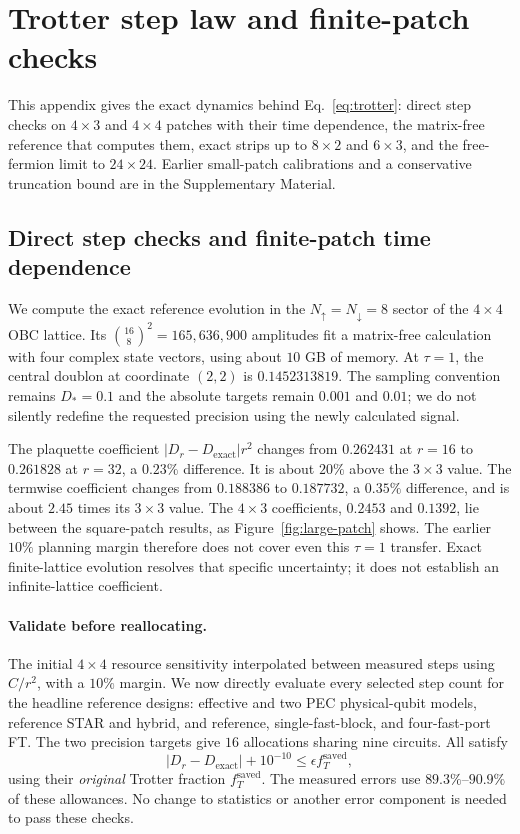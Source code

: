 \documentclass[11pt]{article}
\newcommand{\eps}{\epsilon}
\begin{document}
\clearpage
\appendix

\section{Trotter step law and finite-patch checks}\label{app:trotter}
This appendix gives the exact dynamics behind Eq.~\eqref{eq:trotter}: direct step checks on $4\times3$ and $4\times4$ patches with their time dependence, the matrix-free reference that computes them, exact strips up to $8\times2$ and $6\times3$, and the free-fermion limit to $24\times24$. Earlier small-patch calibrations and a conservative truncation bound are in the Supplementary Material.

\subsection{Direct step checks and finite-patch time dependence}\label{sec:large-patch}
We compute the exact reference evolution in the
$N_\uparrow=N_\downarrow=8$ sector of the $4\times4$ OBC lattice.
Its $\binom{16}{8}^2=165{,}636{,}900$ amplitudes fit a matrix-free
calculation with four complex state vectors, using about $10$ GB of memory.
At $\tau=1$, the central doublon at coordinate $(2,2)$ is
$0.1452313819$. The sampling convention remains $D_*=0.1$ and the
absolute targets remain $0.001$ and $0.01$; we do not silently redefine the
requested precision using the newly calculated signal.

The plaquette coefficient $|D_r-D_{\mathrm{exact}}|r^2$ changes from
$0.262431$ at $r=16$ to $0.261828$ at $r=32$, a $0.23\%$ difference.
It is about $20\%$ above the $3\times3$ value. The termwise coefficient
changes from $0.188386$ to $0.187732$, a $0.35\%$ difference, and is
about $2.45$ times its $3\times3$ value. The $4\times3$ coefficients,
$0.2453$ and $0.1392$, lie between the square-patch results, as
Figure~\ref{fig:large-patch} shows. The earlier $10\%$ planning margin therefore does not cover even
this $\tau=1$ transfer. Exact finite-lattice evolution resolves that
specific uncertainty; it does not establish an infinite-lattice coefficient.

\paragraph{Validate before reallocating.}
The initial $4\times4$ resource sensitivity interpolated between measured
steps using $C/r^2$, with a $10\%$ margin. We now directly evaluate every
selected step count for the headline reference designs: effective and two
PEC physical-qubit models, reference STAR and hybrid, and reference, single-fast-block,
and four-fast-port FT. The two precision targets give $16$ allocations
sharing nine circuits. All satisfy
\begin{equation}
 |D_r-D_{\mathrm{exact}}|+10^{-10}
 \leq \eps f_T^{\mathrm{saved}},
\end{equation}
using their \emph{original} Trotter fraction $f_T^{\mathrm{saved}}$.
The measured errors use $89.3\%$--$90.9\%$ of these allowances. No change
to statistics or another error component is needed to pass these checks.
\end{document}
